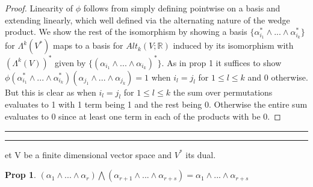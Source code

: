 \documentclass[11pt]{article}
\newcommand{\R}{\mathbb{R}}
\newcommand{\question}[2] {\vspace{.25in} \hrule\vspace{0.5em}
\noindent{\bf #1: #2} \vspace{0.5em}
\hrule \vspace{.10in}}
\newtheorem{prop}{Prop}
\begin{document}
\begin{proof}
	Linearity of $\phi$ follows from simply defining pointwise on a basis and extending linearly, which well defined via the alternating nature of the wedge product. %
	We show the rest of the isomorphism by showing a basis $\{\alpha_{i_1}^* \wedge ... \wedge \alpha_{i_k}^*\}$ for $\Lambda^k(V^*)$ maps to a basis for $Alt_k(V;\R)$ induced by its isomorphism with $(\Lambda^k(V))^*$ given by $\{(\alpha_{i_1} \wedge ... \wedge \alpha_{i_k})^*\}$. As in prop 1 it suffices to show $\phi(\alpha_{i_1}^* \wedge ... \wedge \alpha_{i_k}^*)(\alpha_{j_1} \wedge ... \wedge \alpha_{j_k}) = 1$ when $i_l = j_l$ for $1 \leq l \leq k$ and 0 otherwise. But this is clear as when $i_l = j_l$ for $1 \leq l \leq k$ the sum over permutations evaluates to 1 with 1 term being 1 and the rest being 0. Otherwise the entire sum evaluates to 0 since at least one term in each of the products with be 0.

	

\end{proof}

\question{Question 3}

Let V be a finite dimensional vector space and $V^*$ its dual.

\begin{prop}
	$(\alpha_1 \wedge ... \wedge \alpha_r) \bigwedge (\alpha_{r+1} \wedge ... \wedge \alpha_{r+s}) = \alpha_1 \wedge ... \wedge \alpha_{r+s}$
\end{prop}
\end{document}
